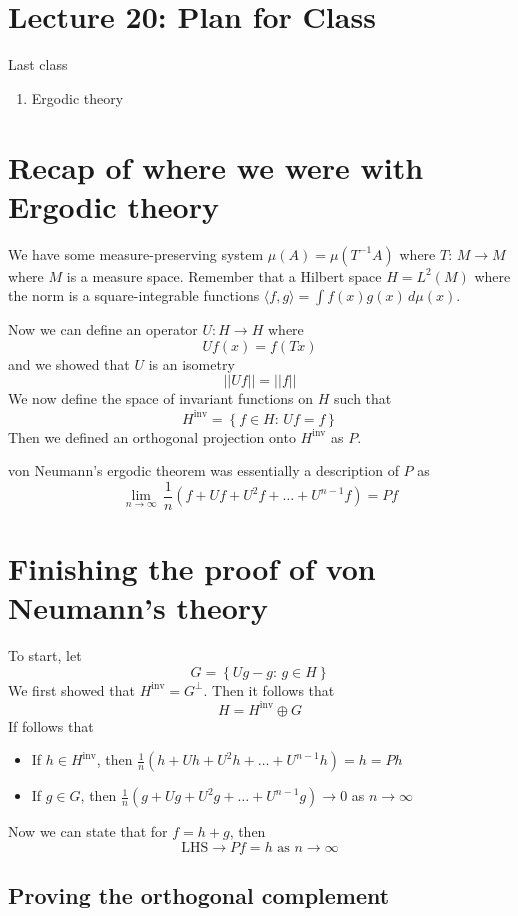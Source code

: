 \documentclass{article}
\begin{document}
\section{Lecture 20: Plan for Class}
Last class
\begin{enumerate}
    \item Ergodic theory
\end{enumerate}

\section{Recap of where we were with Ergodic theory}

We have some measure-preserving system $\mu(A)=\mu(T^{-1}A)$ where $T:\, M\to M$ where $M$ is a measure space. Remember that a Hilbert space $H=L^2(M)$ where the norm is a square-integrable functions $\langle f,g\rangle = \int f(x)g(x)\, d\mu(x)$.

Now we can define an operator $U:H\to H$ where 
\[
Uf(x)=f(Tx)
\]
and we showed that $U$ is an isometry
\[
\left|\left| Uf \right|\right| = \left|\left| f \right|\right|
\]
We now define the space of invariant functions on $H$ such that 
\[
H^{\text{inv}} = \left\{ f\in H:\, Uf=f \right\}
\]
Then we defined an orthogonal projection onto $H^{\text{inv}}$ as $P$.

von Neumann's ergodic theorem was essentially a description of $P$ as 
\[
\lim_{n\to\infty}\,\frac{1}{n}\left(f+ Uf + U^2 f +\ldots + U^{n-1}f\right) = Pf
\]

\section{Finishing the proof of von Neumann's theory}

To start, let 
\[
G=\left\{ Ug - g :\, g\in H \right\}
\]
We first showed that $H^{\text{inv}}= G^\bot$. Then it follows that 
\[
H = H^{\text{inv}}\oplus G
\]
If follows that 
\begin{itemize}
    \item If $h\in H^{\text{inv}}$, then $\frac{1}{n}\left(h+ Uh + U^2 h +\ldots + U^{n-1}h\right) = h = Ph$
    \item If $g\in G$, then $\frac{1}{n}\left(g+ Ug + U^2 g +\ldots + U^{n-1}g\right) \to 0$ as $n\to \infty$
\end{itemize}
Now we can state that for $f=h+g$, then
\[
\text{LHS}\to Pf = h \text{ as } n\to\infty
\]

\subsection{Proving the orthogonal complement}
\end{document}

